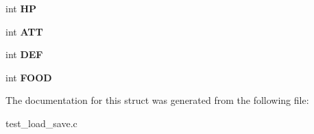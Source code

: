 \begin{DoxyCompactItemize}
\item 
int {\bfseries HP}\hypertarget{structjoueur_a2513e87b18386d51134deb0e5b545ffa}{}\label{structjoueur_a2513e87b18386d51134deb0e5b545ffa}

\item 
int {\bfseries A\+TT}\hypertarget{structjoueur_a634240cabde5e517547d78c91438d777}{}\label{structjoueur_a634240cabde5e517547d78c91438d777}

\item 
int {\bfseries D\+EF}\hypertarget{structjoueur_a1a20f6b62124adfb6b51346432192579}{}\label{structjoueur_a1a20f6b62124adfb6b51346432192579}

\item 
int {\bfseries F\+O\+OD}\hypertarget{structjoueur_abc54b93d67089379f35ea0d1f0df132c}{}\label{structjoueur_abc54b93d67089379f35ea0d1f0df132c}

\end{DoxyCompactItemize}


The documentation for this struct was generated from the following file\+:\begin{DoxyCompactItemize}
\item 
test\+\_\+load\+\_\+save.\+c\end{DoxyCompactItemize}
